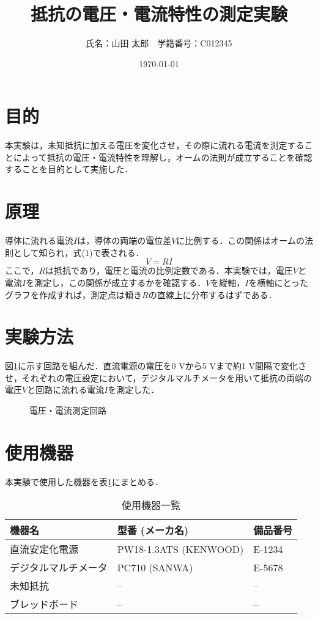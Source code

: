\documentclass{ltjsarticle}
\title{抵抗の電圧・電流特性の測定実験}
\author{氏名：山田 太郎　学籍番号：C012345}
\date{\today}
\begin{document}
\maketitle
\pagestyle{plain} %

\section{目的}
本実験は，未知抵抗に加える電圧を変化させ，その際に流れる電流を測定することによって抵抗の電圧・電流特性を理解し，オームの法則が成立することを確認することを目的として実施した．

\section{原理}
導体に流れる電流$I$は，導体の両端の電位差$V$に比例する．この関係はオームの法則として知られ，式(1)で表される．
\begin{equation}
V = RI
\end{equation}
ここで，$R$は抵抗であり，電圧と電流の比例定数である．本実験では，電圧$V$と電流$I$を測定し，この関係が成立するかを確認する．$V$を縦軸，$I$を横軸にとったグラフを作成すれば，測定点は傾き$R$の直線上に分布するはずである．

\section{実験方法}
図\ref{fig:circuit}に示す回路を組んだ．直流電源の電圧を0 Vから5 Vまで約1 V間隔で変化させ，それぞれの電圧設定において，デジタルマルチメータを用いて抵抗の両端の電圧$V$と回路に流れる電流$I$を測定した．

\begin{figure}[h]
\centering
\caption{電圧・電流測定回路}
\label{fig:circuit}
\end{figure}

\section{使用機器}
本実験で使用した機器を表\ref{tab:equipment}にまとめる．

\begin{table}[h]
\centering
\caption{使用機器一覧}
\label{tab:equipment}
\begin{tabular}{lll}
\hline
機器名 & 型番 (メーカ名) & 備品番号 \\
\hline
直流安定化電源 & PW18-1.3ATS (KENWOOD) & E-1234 \\
デジタルマルチメータ & PC710 (SANWA) & E-5678 \\
未知抵抗 & -- & -- \\
ブレッドボード & -- & -- \\
\hline
\end{tabular}
\end{table}
\end{document}
